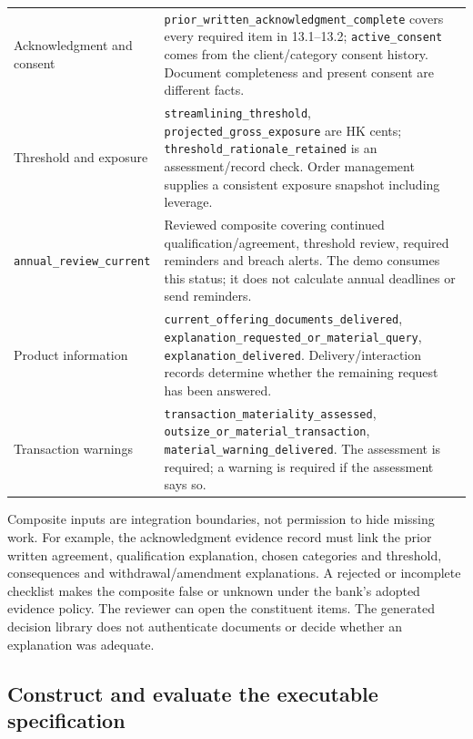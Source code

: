 \begin{longtable}{P{0.30\textwidth}P{0.60\textwidth}}
Acknowledgment and consent & \texttt{prior\_written\_acknowledgment\_complete} covers every required item in 13.1--13.2; \texttt{active\_consent} comes from the client/category consent history. Document completeness and present consent are different facts.\\
Threshold and exposure & \texttt{streamlining\_threshold}, \texttt{projected\_gross\_exposure} are HK cents; \texttt{threshold\_rationale\_retained} is an assessment/record check. Order management supplies a consistent exposure snapshot including leverage.\\
\texttt{annual\_review\_current} & Reviewed composite covering continued qualification/agreement, threshold review, required reminders and breach alerts. The demo consumes this status; it does not calculate annual deadlines or send reminders.\\
Product information & \texttt{current\_offering\_documents\_delivered}, \texttt{explanation\_requested\_or\_material\_query}, \texttt{explanation\_delivered}. Delivery/interaction records determine whether the remaining request has been answered.\\
Transaction warnings & \texttt{transaction\_materiality\_assessed}, \texttt{outsize\_or\_material\_transaction}, \texttt{material\_warning\_delivered}. The assessment is required; a warning is required if the assessment says so.\\
\bottomrule
\end{longtable}
\endgroup

Composite inputs are integration boundaries, not permission to hide missing
work. For example, the acknowledgment evidence record must link the prior
written agreement, qualification explanation, chosen categories and threshold,
consequences and withdrawal/amendment explanations. A rejected or incomplete
checklist makes the composite false or unknown under the bank's adopted evidence
policy. The reviewer can open the constituent items. The generated decision
library does not authenticate documents or decide whether an explanation was
adequate.

\subsection{Construct and evaluate the executable specification}

